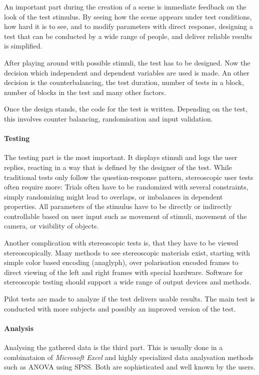 An important part during the creation of a scene is immediate feedback on the look of the test stimulus.
By seeing how the scene appears under test conditions, how hard it is to see, and to modify parameters with direct response,
designing a test that can be conducted by a wide range of people, and deliver reliable results is simplified.

After playing around with possible stimuli, the test has to be designed.
Now the decision which independent and dependent variables are used is made.
An other decision is the counterbalancing, the test duration, number of tests in a block, number of blocks in the test and many other factors.

Once the design stands, the code for the test is written.
Depending on the test, this involves counter balancing, randomisation and input validation.


\paragraph{Testing}
The testing part is the most important. It displays stimuli and logs the user replies, reacting in a way that is defined by the designer of the test. While traditional tests only follow the question-response pattern, stereoscopic user tests often require more: Trials often have to be randomized with several constraints, simply randomizing might lead to overlaps, or imbalances in dependent properties. All parameters of the stimulus have to be directly or indirectly controllable based on user input such as movement of stimuli, movement of the camera, or visibility of objects.

Another complication with stereoscopic tests is, that they have to be viewed stereoscopically.
Many methods to see stereoscopic materials exist, starting with simple color based encoding (anaglyph), over polarisation encoded frames to direct viewing of the left and right frames with special hardware.
Software for stereoscopic testing should support a wide range of output devices and methods.

Pilot tests are made to analyze if the test delivers usable results.
The main test is conducted with more subjects and possibly an improved version of the test.

\paragraph{Analysis}
Analysing the gathered data is the third part. This is usually done in a combinataion of \textit{Microsoft Excel} and highly specialized data analysation methods such as ANOVA using SPSS. Both are sophisticated and well known by the users.

